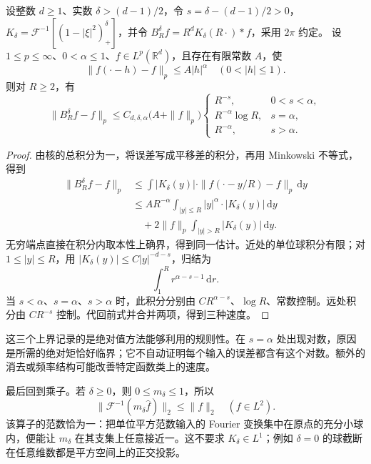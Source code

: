 \begin{proposition}[平移模给出的逼近速度]\label{b2:prop:A2-approximation-rate}
设整数 \(d\geq1\)、实数 \(\delta>(d-1)/2\)，令
\(s=\delta-(d-1)/2>0\)，
\(K_\delta=\mathcal F^{-1}[(1-|\xi|^2)_+^\delta]\)，并令
\(B_R^\delta f=R^dK_\delta(R\cdot)*f\)，采用 \(2\pi\) 约定。
设 \(1\leq p\leq\infty\)、\(0<\alpha\leq1\)、\(f\in L^p(\mathbb R^d)\)，且存在有限常数 \(A\)，使
\[
 \|f(\cdot-h)-f\|_p\leq A|h|^\alpha
 \quad(0<|h|\leq1).
\]
则对 \(R\geq2\)，有
\[
 \|B_R^\delta f-f\|_p
 \leq C_{d,\delta,\alpha}\bigl(A+\|f\|_p\bigr)
 \begin{cases}
 R^{-s},&0<s<\alpha,\\
 R^{-\alpha}\log R,&s=\alpha,\\
 R^{-\alpha},&s>\alpha.
 \end{cases}
\]
\end{proposition}
\begin{proof}
由核的总积分为一，将误差写成平移差的积分，再用 Minkowski 不等式，得到
\[
 \begin{aligned}
 \|B_R^\delta f-f\|_p
 &\leq\int |K_\delta(y)|\cdot
              \|f(\cdot-y/R)-f\|_p\,\mathrm dy\\
 &\leq A R^{-\alpha}
       \int_{|y|\leq R}|y|^\alpha\cdot|K_\delta(y)|\,\mathrm dy\\
 &\quad+2\|f\|_p
       \int_{|y|>R}|K_\delta(y)|\,\mathrm dy.
 \end{aligned}
\]
无穷端点直接在积分内取本性上确界，得到同一估计。近处的单位球积分有限；对 \(1\leq|y|\leq R\)，用
\(|K_\delta(y)|\leq C|y|^{-d-s}\)，归结为
\[
 \int_1^R r^{\alpha-s-1}\,\mathrm dr.
\]
当 \(s<\alpha\)、\(s=\alpha\)、\(s>\alpha\) 时，此积分分别由
\(CR^{\alpha-s}\)、\(\log R\)、常数控制。远处积分由 \(CR^{-s}\) 控制。代回前式并合并两项，得到三种速度。
\end{proof}

这三个上界记录的是绝对值方法能够利用的规则性。在 \(s=\alpha\) 处出现对数，原因是所需的绝对矩恰好临界；它不自动证明每个输入的误差都含有这个对数。额外的消去或频率结构可能改善特定函数类上的速度。

\ProseParagraphBreak

最后回到乘子。若 \(\delta\geq0\)，则 \(0\leq m_\delta\leq1\)，所以
\[
 \|\mathcal F^{-1}(m_\delta\widehat f)\|_2\leq\|f\|_2
 \quad(f\in L^2).
\]
该算子的范数恰为一：把单位平方范数输入的 Fourier 变换集中在原点的充分小球内，便能让 \(m_\delta\) 在其支集上任意接近一。这不要求
\(K_\delta\in L^1\)；例如 \(\delta=0\) 的球截断在任意维数都是平方空间上的正交投影。

